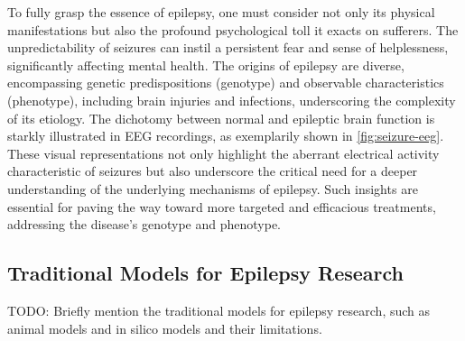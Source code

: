 \documentclass[10pt]{article}
\begin{document}
\begin{sloppypar}
  To fully grasp the essence of epilepsy, one must consider not only its physical manifestations but also the profound psychological toll it exacts on sufferers. The unpredictability of seizures can instil a persistent fear and sense of helplessness, significantly affecting mental health. The origins of epilepsy are diverse, encompassing genetic predispositions (genotype) and observable characteristics (phenotype), including brain injuries and infections, underscoring the complexity of its etiology.
  The dichotomy between normal and epileptic brain function is starkly illustrated in EEG recordings, as exemplarily shown in \autoref{fig:seizure-eeg}. These visual representations not only highlight the aberrant electrical activity characteristic of seizures but also underscore the critical need for a deeper understanding of the underlying mechanisms of epilepsy. Such insights are essential for paving the way toward more targeted and efficacious treatments, addressing the disease's genotype and phenotype.

  \subsection{Traditional Models for Epilepsy Research}
  \label{sec:traditional-models-for-epilepsy-research}
  TODO: Briefly mention the traditional models for epilepsy research, such as animal models and in silico models and their limitations.


\end{sloppypar}
\end{document}
